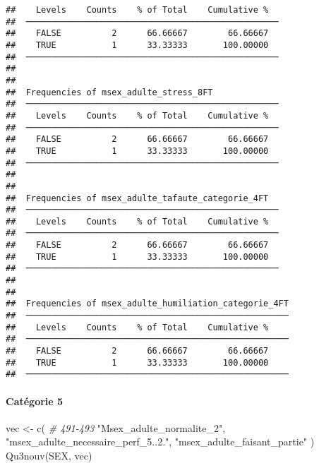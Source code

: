 \documentclass[
]{article}
\newenvironment{Shaded}{\begin{snugshade}}{\end{snugshade}}
\newcommand{\CommentTok}[1]{\textcolor[rgb]{0.56,0.35,0.01}{\textit{#1}}}
\newcommand{\FunctionTok}[1]{\textcolor[rgb]{0.00,0.00,0.00}{#1}}
\newcommand{\NormalTok}[1]{#1}
\newcommand{\OtherTok}[1]{\textcolor[rgb]{0.56,0.35,0.01}{#1}}
\newcommand{\StringTok}[1]{\textcolor[rgb]{0.31,0.60,0.02}{#1}}
\begin{document}
\begin{verbatim}
##    Levels    Counts    % of Total    Cumulative %   
##  ────────────────────────────────────────────────── 
##    FALSE          2      66.66667        66.66667   
##    TRUE           1      33.33333       100.00000   
##  ────────────────────────────────────────────────── 
## 
## 
##  Frequencies of msex_adulte_stress_8FT              
##  ────────────────────────────────────────────────── 
##    Levels    Counts    % of Total    Cumulative %   
##  ────────────────────────────────────────────────── 
##    FALSE          2      66.66667        66.66667   
##    TRUE           1      33.33333       100.00000   
##  ────────────────────────────────────────────────── 
## 
## 
##  Frequencies of msex_adulte_tafaute_categorie_4FT   
##  ────────────────────────────────────────────────── 
##    Levels    Counts    % of Total    Cumulative %   
##  ────────────────────────────────────────────────── 
##    FALSE          2      66.66667        66.66667   
##    TRUE           1      33.33333       100.00000   
##  ────────────────────────────────────────────────── 
## 
## 
##  Frequencies of msex_adulte_humiliation_categorie_4FT 
##  ──────────────────────────────────────────────────── 
##    Levels    Counts    % of Total    Cumulative %   
##  ──────────────────────────────────────────────────── 
##    FALSE          2      66.66667        66.66667   
##    TRUE           1      33.33333       100.00000   
##  ────────────────────────────────────────────────────
\end{verbatim}

\hypertarget{catuxe9gorie-5-1}{%
\paragraph{Catégorie 5}\label{catuxe9gorie-5-1}}

\begin{Shaded}
\begin{Highlighting}[]
\NormalTok{vec }\OtherTok{\textless{}{-}} \FunctionTok{c}\NormalTok{(  }\CommentTok{\# 491{-}493}
  \StringTok{"Msex\_adulte\_normalite\_2"}\NormalTok{,                             }
  \StringTok{"msex\_adulte\_necessaire\_perf\_5..2."}\NormalTok{,}
  \StringTok{"msex\_adulte\_faisant\_partie"}
\NormalTok{)}
\FunctionTok{Qu3nouv}\NormalTok{(SEX, vec)}
\end{Highlighting}
\end{Shaded}
\end{document}
